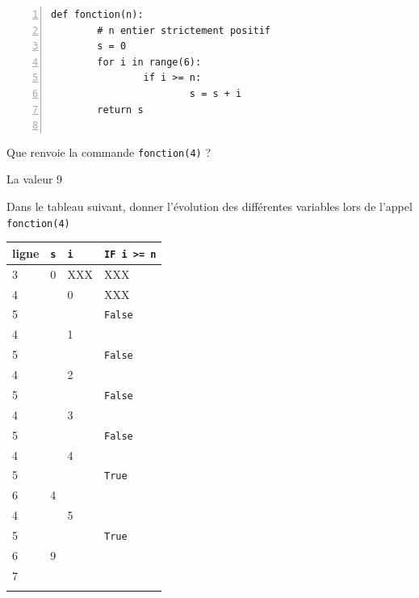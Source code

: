 \documentclass[a4paper,12pt,openany]{book}
\begin{document}
\newpage

\exo 

\begin{minipage}{10cm}
\begin{lstlisting}[numbers=left]
def fonction(n):
		# n entier strictement positif 
		s = 0
		for i in range(6):
				if i >= n:
						s = s + i
		return s
		
\end{lstlisting}
\end{minipage}
\begin{minipage}{8cm}
\begin{liste}
	\item 	Que renvoie la commande \verb+fonction(4)+ ? \dotfill
	
	La valeur 9
	
	 	\item Dans le tableau suivant, donner l'évolution des différentes variables lors de l'appel \verb+fonction(4)+

	\end{liste}
\end{minipage}
	




	
\begin{center}
\renewcommand{\arraystretch}{1.2}	
\begin{tabular}{|p{2cm}|p{2cm}|p{2cm}|p{2cm}|}
\hline
ligne & \verb+s+ & \verb+i+ & \verb+IF i >= n+    \\ \hline
3 & 0 & XXX&XXX\\ \hline
4 &  &0 &XXX\\ \hline
5 & & &\verb+False+ \\ \hline
4 & &1 &\\ \hline
5 & & &\verb+False+ \\ \hline
4 & &2 &\\ \hline
5 & & &\verb+False+ \\ \hline
4 & &3 &\\ \hline
5 & & &\verb+False+ \\ \hline
4 & &4 &\\ \hline
5 & & &\verb+True+ \\ \hline
6 &4 & &\\ \hline
4 & &5 &\\ \hline
5 & & &\verb+True+ \\ \hline
6 &9 & &\\ \hline
7 & & &\\ \hline
 & & &\\ \hline


\end{tabular}	
\end{center}
	
\end{document}
